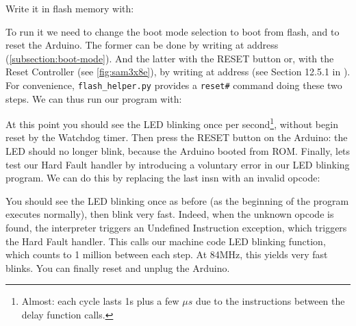 Write it in flash memory with:


To run it we need to change the boot mode selection to boot from flash, and to
reset the Arduino. The former can be done by writing  at address
 (\cf \cref{subsection:boot-mode}). And the latter
with the RESET button or, with the Reset Controller (see \cref{fig:sam3x8e}),
by writing  at address  (see Section 12.5.1 in
\cite{SAM3X8E}). For convenience, \verb!flash_helper.py! provides a
\verb!reset#! command doing these two steps. We can thus run our program with:



At this point you should see the LED blinking once per second\footnote{Almost:
each cycle lasts 1s plus a few $\mu s$ due to the instructions between the
delay function calls.}, without begin reset by the Watchdog timer. Then press
the RESET button on the Arduino: the LED should no longer blink, because the
Arduino booted from ROM. Finally, lets test our Hard Fault handler by
introducing a voluntary error in our LED blinking program. We can do this by
replacing the last  insn with an invalid  opcode:


You should see the LED blinking once as before (as the beginning of the program
executes normally), then blink very fast. Indeed, when the unknown opcode is
found, the interpreter triggers an Undefined Instruction exception, which
triggers the Hard Fault handler. This calls our machine code LED blinking
function, which counts to 1 million between each step. At 84MHz, this yields
very fast blinks. You can finally reset and unplug the Arduino.

